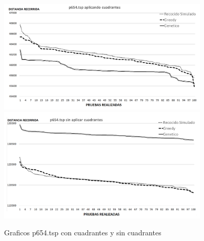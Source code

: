  \begin{figure}[hbtp]
    \centering
        \includegraphics[width=0.9\textwidth]{PruebasResultados/Experimentos_Graficos_Con/p654.png}
        \includegraphics[width=0.9\textwidth]{PruebasResultados/Experimentos_Graficos_Sin/p654.png}
        \caption{Graficos p654.tsp con cuadrantes y sin cuadrantes}
        \label{fig:p654_grafica.png}
\end{figure}
\newpage

